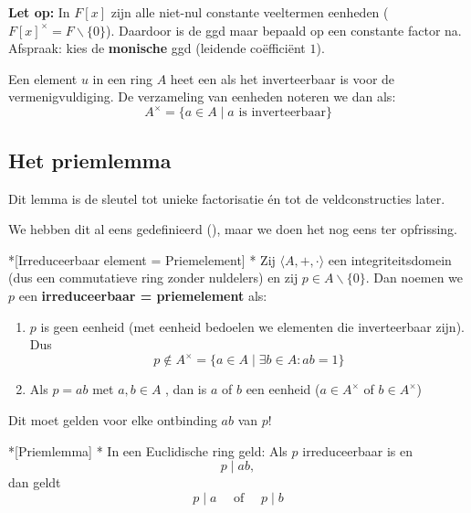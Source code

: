 \begin{barbox}[WildStrawberry][gray!3]
    \textcolor{WildStrawberry}{\textbf{Let op:}} In $F[x]$ zijn alle niet-nul constante veeltermen eenheden ($F[x]^{\times} = F \backslash \{0\}$). Daardoor is de ggd maar bepaald op een constante factor na. Afspraak: kies de \textcolor{WildStrawberry}{\textbf{monische}} ggd (leidende coëfficiënt $1$).
\end{barbox}

\textbf{} Een element $u$ in een ring $A$ heet een  als het inverteerbaar is voor de vermenigvuldiging. De verzameling van eenheden noteren we dan als:
\begin{equation*}
    A^{\times} = \{a \in A \mid a \text{ is inverteerbaar}\}
\end{equation*}

\subsection{Het priemlemma}

Dit lemma is de sleutel tot unieke factorisatie én tot de veldconstructies later.

We hebben dit al eens gedefinieerd (), maar we doen het nog eens ter opfrissing.

\begin{nicedefinition}*[Irreduceerbaar element = Priemelement]
    \nextpart[]*
    Zij $\langle A, +, \cdot \rangle$ een integriteitsdomein (dus een commutatieve ring zonder nuldelers) en zij $p \in A\backslash\{0\}$. Dan noemen we $p$ een \textcolor{PineGreen!75!black}{\textbf{irreduceerbaar = priemelement}} als:
    \begin{enumerate}
        \item $p$ is geen eenheid (met eenheid bedoelen we elementen die inverteerbaar zijn). Dus
        \begin{equation*}
            p \notin A^{\times} = \{a \in A \mid \exists b \in A : ab=1\}
        \end{equation*} 
        \item Als $p=ab$ met $a,b \in A$ , dan is $a$ of $b$ een eenheid ($a \in A^{\times}$ of $b \in A^{\times}$)
    \end{enumerate}
\end{nicedefinition}

\textbf{} Dit moet gelden voor elke ontbinding $ab$ van $p$!

\newpage
\begin{nicelemma}*[Priemlemma]
    \nextpart[]*
    In een Euclidische ring geld: Als $p$ irreduceerbaar is en
    \begin{equation*}
        p \mid ab,
    \end{equation*}
    dan geldt
    \begin{equation*}
        p\mid a \quad \text{ of } \quad p \mid b
    \end{equation*}
\end{nicelemma}

